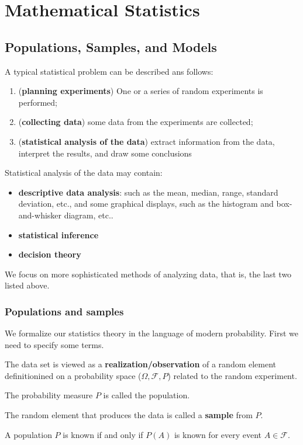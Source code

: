 \chapter{Mathematical Statistics}

\section{Populations, Samples, and Models}
A typical statistical problem can be described ans follows:
\begin{enumerate}
\item (\textbf{planning experiments}) One or a series of random experiments is performed;
\item (\textbf{collecting data}) some data from the experiments are collected;
\item (\textbf{statistical analysis of the data}) extract information from the data, interpret the results, and draw some conclusions
\end{enumerate}
Statistical analysis of the data may contain:
\begin{itemize}
\item \textbf{descriptive data analysis}: such as the mean, median, range, standard deviation, etc., and some graphical displays, such as the histogram and box-and-whisker diagram, etc..
\item \textbf{statistical inference}
\item \textbf{decision theory}
\end{itemize}
We focus on more sophisticated methods of analyzing data, that is, the last two listed above.
\subsection{Populations and samples}
We formalize our statistics theory in the language of modern probability. First we need to specify some terms.
\begin{definition}
The data set is viewed as a \textbf{realization/observation} of a random element definitionined on a probability space ($\Omega,\mathcal{F},P$) related to the random experiment.
\end{definition}
\begin{definition}[population]
The probability measure $P$ is called the population.
\end{definition}
\begin{definition}[sample]
The random element that produces the data is called a \textbf{sample} from $P$. 
\end{definition}
\begin{definition}[known]
A population $P$ is known if and only if $P(A)$ is known for every event $A\in\mathcal{F}$.
\end{definition}
